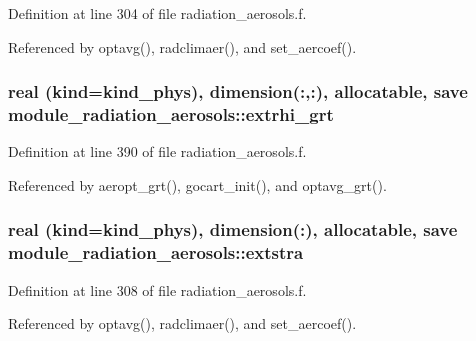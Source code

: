 Definition at line 304 of file radiation\+\_\+aerosols.\+f.



Referenced by optavg(), radclimaer(), and set\+\_\+aercoef().

\subsubsection[{\texorpdfstring{extrhi\+\_\+grt}{extrhi_grt}}]{\setlength{\rightskip}{0pt plus 5cm}real (kind=kind\+\_\+phys), dimension(\+:,\+:), allocatable, save module\+\_\+radiation\+\_\+aerosols\+::extrhi\+\_\+grt\hspace{0.3cm}{\ttfamily [private]}}\hypertarget{group__module__radiation__aerosols_gacb7ff037be78e950ea42d956816c93d5}{}\label{group__module__radiation__aerosols_gacb7ff037be78e950ea42d956816c93d5}


Definition at line 390 of file radiation\+\_\+aerosols.\+f.



Referenced by aeropt\+\_\+grt(), gocart\+\_\+init(), and optavg\+\_\+grt().

\subsubsection[{\texorpdfstring{extstra}{extstra}}]{\setlength{\rightskip}{0pt plus 5cm}real (kind=kind\+\_\+phys), dimension(\+:), allocatable, save module\+\_\+radiation\+\_\+aerosols\+::extstra\hspace{0.3cm}{\ttfamily [private]}}\hypertarget{group__module__radiation__aerosols_gac0c59f22f472671cd86221cc1ed46c60}{}\label{group__module__radiation__aerosols_gac0c59f22f472671cd86221cc1ed46c60}


Definition at line 308 of file radiation\+\_\+aerosols.\+f.



Referenced by optavg(), radclimaer(), and set\+\_\+aercoef().

